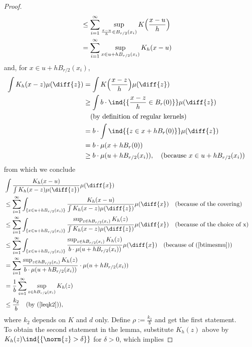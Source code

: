 \begin{proof}
\begin{align*}
        &\leq \sum_{i=1}^\infty \sup\limits_{\frac{x-u}{h} \in B_{r/2}(x_i)} K\Bigl(\frac{x-u}{h}\Bigr) \\
        &= \sum_{i=1}^\infty \sup\limits_{x \in u+hB_{r/2}(x_i)} K_h(x-u)
    \end{align*}
    and, for $x \in u+hB_{r/2}(x_i)$,
    \begin{align} \label{btimesmu}
        \int K_h(x-z) \mu(\diff{z})
        &= \int K\Bigl(\frac{x-z}{h}\Bigr) \mu(\diff{z}) \\
        &\geq \int b \cdot \ind{\{ \frac{x-z}{h} \in B_r(0) \}} \mu(\diff{z}) \nonumber \\ &\quad\text{(by definition of regular kernels)} \nonumber \\
        &= b \cdot \int \ind{\{ z \in x+hB_r(0) \}} \mu(\diff{z}) \nonumber \\
        &= b \cdot \mu(x+hB_r(0)) \nonumber \\ 
        &\geq b \cdot \mu(u+hB_{r/2}(x_i)), \quad\text{(because $x \in u+hB_{r/2}(x_i)$)}\nonumber   
    \end{align}
    from which we conclude
    \begin{align*}
        &\int \frac{K_h(x-u)}{\int K_h(x-z) \mu(\diff{z})} \mu(\diff{x}) \\
        &\leq \sum_{i=1}^\infty \int_{\{ x \in u+hB_{r/2}(x_i) \}} \frac{K_h(x-u)}{\int K_h(x-z) \mu(\diff{z})} \mu(\diff{x}) \quad \text{(because of the covering)} \\
        &\leq \sum_{i=1}^\infty \int_{\{ x \in u+hB_{r/2}(x_i) \}} \frac{ \sup_{z\in hB_{r/2}(x_i)} K_h(z) }{\int K_h(x-z) \mu(\diff{z})} \mu(\diff{x}) \quad \text{(because of the choice of x)} \\
        &\leq \sum_{i=1}^\infty \int_{\{ x \in u+hB_{r/2}(x_i) \}} \frac{ \sup_{z\in hB_{r/2}(x_i)} K_h(z) }{b \cdot \mu(u+hB_{r/2}(x_i))} \mu(\diff{x}) \quad \text{(because of (\ref{btimesmu}))} \\
        &= \sum_{i=1}^\infty \frac{ \sup_{z\in hB_{r/2}(x_i)} K_h(z) }{b \cdot \mu(u+hB_{r/2}(x_i))} \cdot \mu(u+hB_{r/2}(x_i)) \\
        &= \frac{1}{b} \sum_{i=1}^\infty \sup\limits_{z\in hB_{r/2}(x_i)} K_h(z) \\
        &\leq \frac{k_2}{b} \quad\text{(by (\ref{leqk2}))},
    \end{align*}
    where $k_2$ depends on $K$ and $d$ only. Define $\rho := \frac{k_2}{b}$ and get the first statement. \\
    To obtain the second statement in the lemma, substitute $K_h(z)$ above by $K_h(z) \ind{\{\norm{z}>\delta\}}$ for $\delta > 0$, which implies

\end{proof}
